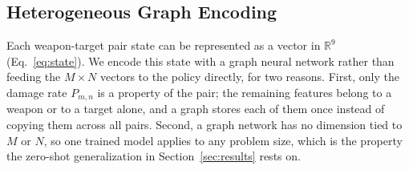 \subsection{Heterogeneous Graph Encoding}
\label{sec:encoding}

Each weapon-target pair state can be represented as a vector in $\mathbb{R}^9$ (Eq.~\eqref{eq:state}). We encode this state with a graph neural network rather than feeding the $M \times N$ vectors to the policy directly, for two reasons. First, only the damage rate $P_{m,n}$ is a property of the pair; the remaining features belong to a weapon or to a target alone, and a graph stores each of them once instead of copying them across all pairs. Second, a graph network has no dimension tied to $M$ or $N$, so one trained model applies to any problem size, which is the property the zero-shot generalization in Section~\ref{sec:results} rests on.

